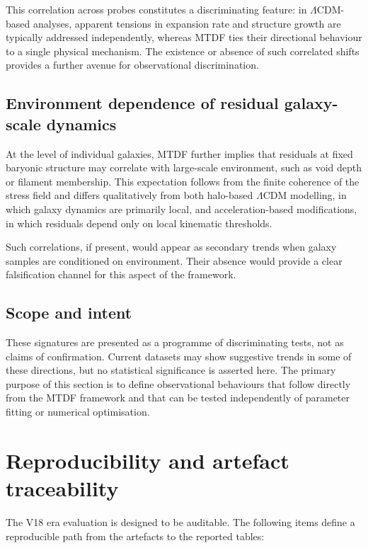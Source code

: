 \documentclass[11pt,a4paper]{article}
\begin{document}
This correlation across probes constitutes a discriminating feature: in $\Lambda$CDM-based analyses, apparent tensions in expansion rate and structure growth are typically addressed independently, whereas MTDF ties their directional behaviour to a single physical mechanism. The existence or absence of such correlated shifts provides a further avenue for observational discrimination.

\subsection{Environment dependence of residual galaxy-scale dynamics}
At the level of individual galaxies, MTDF further implies that residuals at fixed baryonic structure may correlate with large-scale environment, such as void depth or filament membership. This expectation follows from the finite coherence of the stress field and differs qualitatively from both halo-based $\Lambda$CDM modelling, in which galaxy dynamics are primarily local, and acceleration-based modifications, in which residuals depend only on local kinematic thresholds.

Such correlations, if present, would appear as secondary trends when galaxy samples are conditioned on environment. Their absence would provide a clear falsification channel for this aspect of the framework.

\subsection{Scope and intent}
These signatures are presented as a programme of discriminating tests, not as claims of confirmation. Current datasets may show suggestive trends in some of these directions, but no statistical significance is asserted here. The primary purpose of this section is to define observational behaviours that follow directly from the MTDF framework and that can be tested independently of parameter fitting or numerical optimisation.

\section{Reproducibility and artefact traceability}
\label{sec:sec11}
The V18 era evaluation is designed to be auditable. The following items define a reproducible path from the artefacts to the reported tables:
\end{document}
